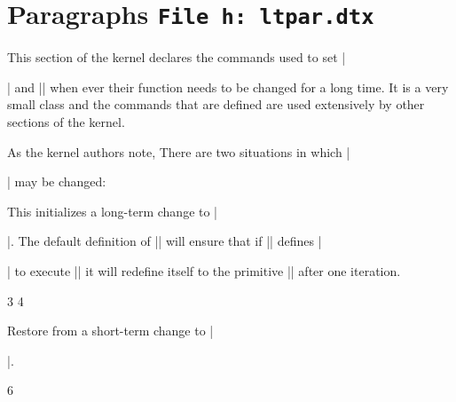\chapter{Paragraphs \texttt{File h: ltpar.dtx}}


This section of the kernel declares the commands used to set |\par| and |\everypar|
when ever their function needs to be changed for a long time. It is a very small class
and the commands that are defined are used extensively by other sections of the kernel.

As the kernel authors note, There are two situations in which |\par| may be changed:


 This initializes a long-term change to |\par|. The default definition of |\@par| will ensure that if |\@restorepar| defines |\par|
to execute |\@par| it will redefine itself to the primitive |\@@par| after one iteration.

\begin{teX}
3 \def\@setpar#1{\def\par{#1}\def\@par{#1}}
4 \def\@par{\let\par\@@par\par}
\end{teX}

 Restore from a short-term change to |\par|.

\begin{teXX}
6 \def\@restorepar{\def\par{\@par}}
\end{teXX}

